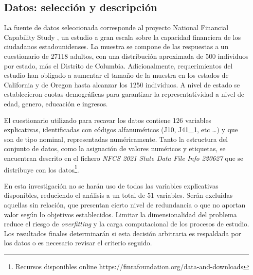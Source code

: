 \documentclass[a4paper, 11pt]{article}
\begin{document}
\subsection{Datos: selección y descripción}
\label{sec:sub:datasets}
La fuente de datos seleccionada corresponde al proyecto National Financial Capability Study 
\cite{NFCS01}, un estudio a gran escala sobre la capacidad financiera de los ciudadanos 
estadounidenses. La muestra se compone de las respuestas a un cuestionario de 27118 adultos, 
con una distribución aproximada de 500 individuos por estado, más el Distrito de Columbia. 
Adicionalmente, requerimientos del estudio han obligado a aumentar el tamaño de la muestra en 
los estados de California y de Oregon hasta alcanzar los 1250 individuos. A nivel de estado 
se establecieron cuotas demográficas para garantizar la representatividad a nivel de edad,
genero, educación e ingresos.

El cuestionario utilizado para recavar los datos contiene 126 variables explicativas, 
identificadas con códigos alfanuméricos (J10, J41\_1, etc \dots) y que son de tipo nominal, 
representadas numéricamente. Tanto la estructura del conjunto de datos, como la asignación de 
valores numéricos y etiquetas, se encuentran descrito en el fichero \textit{NFCS 2021 State 
Data File Info 220627} que se distribuye con los datos\footnote{Recursos disponibles online 
https://finrafoundation.org/data-and-downloads}. 

En esta investigación no se harán uso de todas las variables explicativas disponibles, reduciendo
el análisis a un total de 51 variables. Serán excluidas aquellas sin relación, que presentan cierto
nivel de redundancia o que no aportan valor según lo objetivos establecidos. Limitar la dimensionalidad
del problema reduce el riesgo de \textit{overfitting} y la carga computacional de los 
procesos de estudio. Los resultados finales determinarán si esta decisión arbitraria 
es respaldada por los datos o es necesario revisar el criterio seguido.
\end{document}
